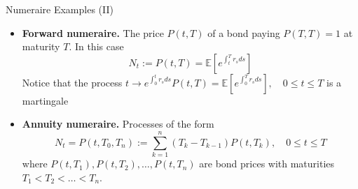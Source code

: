 \documentclass{beamer}
\begin{document}
\begin{frame}{Numeraire Examples (II)}
	\begin{itemize}
		\item \textbf{Forward numeraire.} The price $P(t,T)$ of a bond paying $P(T,T)=1$ at maturity $T$. In this case
		\begin{equation*}
			N_t := P(t,T)=\mathbb{E}\left[e^{\int_t^T r_s ds}\right]
		\end{equation*}
		Notice that the process $t\rightarrow e^{\int_0^t r_s ds} P(t,T)=\mathbb{E}\left[e^{\int_0^T r_s ds}\right], \quad 0 \le t \le T$
		is a martingale
		\item \textbf{Annuity numeraire.} Processes of the form
		\begin{equation*}
			N_t = P(t, T_0, T_n) := \sum_{k=1}^{n}(T_k - T_{k-1})P(t, T_k), \quad 0 \le t \le T
		\end{equation*}
		where $P(t,T_1),P(t,T_2),\ldots,P(t,T_n)$ are bond prices with maturities $T_1 < T_2 < \ldots < T_n$.
	\end{itemize}
\end{frame}

\end{document}
